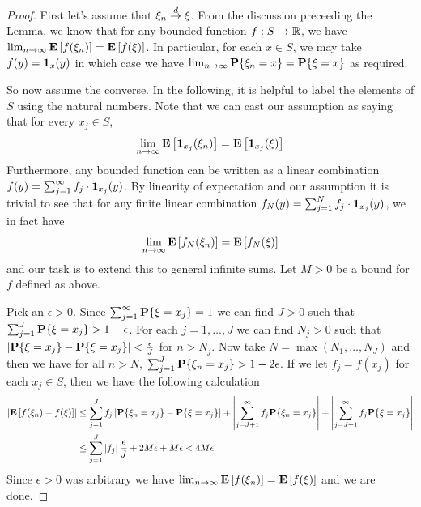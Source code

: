 \begin{proof}
First let's assume that $\xi_n \overset{d}\to \xi$.  From the discussion
preceeding the Lemma, we know that for any bounded function $f : S \to
\mathbb{R}$, we have $\lim_{n \to \infty} \textbf{E}\left[f(\xi_n)\right]  =
\textbf{E}\left[f(\xi)\right]$.  In particular, for each $x \in S$, we may take
$f(y) = \textbf{1}_{x}(y)$ in which case we have
$\lim_{n \to \infty} \textbf{P}\{\xi_n = x\}  =
\textbf{P}\{\xi = x\}$ as required.

So now assume the converse.  In the following, it is helpful to label
the elements of $S$ using the natural numbers.  Note that we can cast our assumption as
saying that for every $x_j \in S$, 
\begin{align*}
\lim_{n \to \infty} \textbf{E}\left[\textbf{1}_{x_j}(\xi_n)\right]  =\textbf{E}\left[\textbf{1}_{x_j}(\xi)\right] 
\end{align*}
Furthermore, any bounded function can be written as a linear
combination $f(y) = \sum_{j=1}^\infty f_j \cdot
\textbf{1}_{x_j}(y)$.  By linearity of expectation and our
assumption it is trivial to see that for any finite linear combination $f_N(y) = \sum_{j=1}^N f_j \cdot
\textbf{1}_{x_j}(y)$, we in fact have
\begin{align*}
\lim_{n \to \infty} \textbf{E}\left[f_N(\xi_n)\right]  =\textbf{E}\left[f_N(\xi)\right] 
\end{align*}
and our task is to extend this to general infinite sums.   Let $M>0$
be a bound for $f$ defined as above.  

Pick an $\epsilon >0$.  Since $\sum_{j=1}^\infty \textbf{P}\{ \xi
  =x_j\} =1$ we can find $J > 0$ such that $\sum_{j=1}^J \textbf{P}\{ \xi
  =x_j\} > 1 - \epsilon$.  For each $j =1, \dots, J$ we can find $N_j >
0$ such that $\left \vert \textbf{P}\{ \xi  = x_j\} - \textbf{P}\{ \xi  =
    x_j\} \right \vert < \frac{\epsilon}{J}$ for $n > N_j$.  Now take $N = \max(N_1,
\dots, N_J)$ and then we have for all $n > N$, $\sum_{j=1}^J \textbf{P}\{ \xi_n
  =x_j\} > 1 - 2\epsilon$. If we let $f_j = f(x_j)$ for each $x_j \in S$, then we
have the following calculation
\begin{align*}
\left \vert \textbf{E}\left[f(\xi_n) - f(\xi)\right] \right \vert &\leq \sum_{j=1}^J f_j
\left \vert \textbf{P}\{\xi_n = x_j\} - \textbf{P}\{\xi = x_j\} \right \vert +
\left \vert \sum_{j=J+1}^\infty f_j \textbf{P}\{\xi_n = x_j\}  \right \vert +
\left \vert \sum_{j=J+1}^\infty f_j \textbf{P}\{\xi = x_j\}  \right \vert \\
&\leq \sum_{j=1}^J\left \vert f_j \right \vert \frac{\epsilon}{J}+ 2M\epsilon + M\epsilon <
4M \epsilon
\end{align*}
Since $\epsilon>0$ was arbitrary we have $\lim_{n \to \infty}
\textbf{E}\left[f(\xi_n)\right] =\textbf{E}\left[f(\xi)\right]$ and we are done.
\end{proof}

